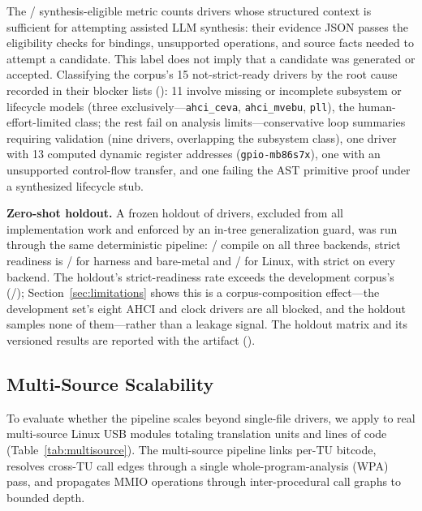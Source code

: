The \LLMReadyCount{}/\EvalDrivers{} synthesis-eligible metric counts drivers
whose structured context is sufficient for attempting assisted LLM synthesis:
their evidence
JSON passes the eligibility checks for bindings, unsupported operations, and
source facts needed to attempt a candidate. This label does not imply that a
candidate was generated or accepted.
Classifying the \EvalDrivers{} corpus's 15 not-strict-ready drivers by the
root cause recorded in their blocker lists
(): 11 involve missing or
incomplete subsystem or lifecycle models (three exclusively---\texttt{ahci\_ceva},
\texttt{ahci\_mvebu}, \texttt{pll}), the human-effort-limited class; the
rest fail on analysis limits---conservative loop summaries requiring
validation (nine drivers, overlapping the subsystem class), one driver with
13 computed dynamic register addresses (\texttt{gpio-mb86s7x}), one with an
unsupported control-flow transfer, and one failing the AST primitive proof
under a synthesized lifecycle stub.

\textbf{Zero-shot holdout.} A frozen holdout of \ZeroShotCases{} drivers,
excluded from all implementation work and enforced by an in-tree
generalization guard, was run through the same deterministic pipeline:
\ZeroShotCompile{}/\ZeroShotCases{} compile on all three backends, strict
readiness is \ZeroShotHarnessStrict{}/\ZeroShotCases{} for harness and
bare-metal and \ZeroShotLinuxStrict{}/\ZeroShotCases{} for Linux, with
\ZeroShotAllStrict{} strict on every backend. The holdout's strict-readiness
rate exceeds the development corpus's (\HarnessReadyCount{}/\EvalDrivers{});
Section~\ref{sec:limitations} shows this is a corpus-composition effect---the
development set's eight AHCI and clock drivers are all blocked, and the
holdout samples none of them---rather than a leakage signal. The holdout
matrix and its versioned results are reported with the artifact
().

\subsection{Multi-Source Scalability}

To evaluate whether the pipeline scales beyond single-file drivers, we apply
\reharness{} to \MultiSourceDrivers{} real multi-source Linux USB modules
totaling \MultiSourceTUs{} translation units and \MultiSourceLines{} lines of
code (Table~\ref{tab:multisource}). The multi-source pipeline links per-TU
bitcode, resolves cross-TU call edges through a single whole-program-analysis
(WPA) pass, and propagates MMIO operations through inter-procedural call
graphs to bounded depth.

